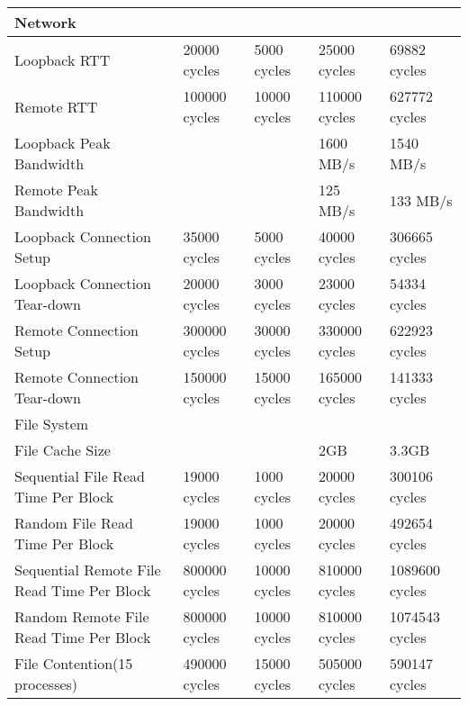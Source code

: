 \small
\begin{center}
\begin{tabular}{| p{4cm} | p{2.5cm} | p{2.5cm} | p{2.5cm} | p{2.5cm} |}

\hline 
Network & & & & \\
\hline
Loopback RTT & 20000 cycles& 5000 cycles& 25000 cycles& 69882 cycles\\
Remote RTT & 100000 cycles& 10000 cycles& 110000 cycles& 627772 cycles\\
Loopback Peak Bandwidth & & & 1600 MB/s & 1540 MB/s \\
Remote Peak Bandwidth & & &  125 MB/s  & 133 MB/s\\
Loopback Connection Setup & 35000 cycles& 5000 cycles& 40000 cycles& 306665 cycles \\
Loopback Connection Tear-down & 20000 cycles& 3000 cycles& 23000 cycles& 54334 cycles \\
Remote Connection Setup & 300000  cycles& 30000 cycles& 330000 cycles& 622923 cycles\\
Remote Connection Tear-down & 150000  cycles& 15000 cycles& 165000 cycles& 141333 cycles\\

\hline 
File System& & & & \\
\hline
File Cache Size & & & 2GB & 3.3GB \\ 
Sequential File Read Time Per Block& 19000 cycles & 1000 cycles& 20000 cycles& 300106 cycles\\
Random File Read Time Per Block& 19000 cycles& 1000 cycles& 20000 cycles& 492654 cycles \\
Sequential Remote File Read Time Per Block& 800000 cycles& 10000 cycles& 810000 cycles& 1089600 cycles\\
Random Remote File Read Time Per Block& 800000 cycles& 10000 cycles& 810000 cycles& 1074543 cycles\\
File Contention(15 processes) & 490000 cycles& 15000 cycles& 505000 cycles& 590147 cycles\\

\end{tabular}
\end{center}